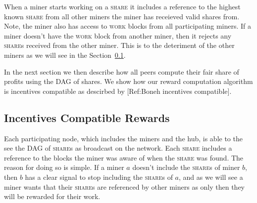 \documentclass{article}
\begin{document}
When a miner starts working on a \textsc{share} it includes a
reference to the highest known \textsc{share} from all other miners
the miner has receieved valid shares from. Note, the miner also has
access to \textsc{work} blocks from all participating miners. If a
miner doesn't have the \textsc{work} block from another miner, then it
rejects any \textsc{share}s received from the other miner. This is to
the deteriment of the other miners as we will see in the
Section~\ref{sec:rewards}.

In the next section we then describe how all peers compute their fair
share of profits using the DAG of shares. We show how our reward
computation algorithm is incentives compatible as descirbed by
[Ref:Boneh incentives compatible].

  
  
\subsection{Incentives Compatible Rewards}\label{sec:rewards}

Each participating node, which includes the miners and the hub, is
able to the see the DAG of \textsc{share}s as broadcast on the
network. Each \textsc{share} includes a reference to the blocks the
miner was aware of when the \textsc{share} was found. The reason for
doing so is simple. If a miner $a$ doesn't include the \textsc{share}s
of miner $b$, then $b$ has a clear signal to stop including the
\textsc{share}s of $a$, and as we will see a miner wants that their
\textsc{share}s are referenced by other miners as only then they will
be rewarded for their work.
\end{document}
